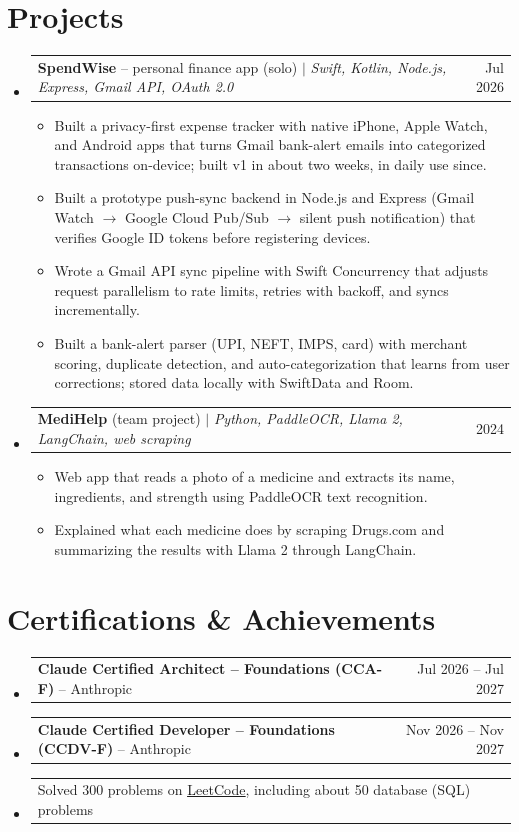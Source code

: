 \documentclass[a4paper,11pt]{article}
\makeatletter
\newcommand{\resumeItem}[1]{\item\small{#1\vspace{-1pt}}}
\newcommand{\resumeProjectHeading}[2]{
    \item
    \begin{tabularx}{0.97\textwidth}{@{}>{\raggedright\arraybackslash}X@{\hspace{0.75em}}r@{}}
      \small#1 & #2 \\
    \end{tabularx}\vspace{-3pt}
}
\newcommand{\resumeSubItemListStart}{\begin{itemize}[leftmargin=0.15in, label={}]}
\newcommand{\resumeSubItemListEnd}{\end{itemize}}
\newcommand{\resumeItemListStart}{\begin{itemize}[itemsep=2pt]}
\newcommand{\resumeItemListEnd}{\end{itemize}\vspace{-2pt}}
\makeatother
\begin{document}
\section{Projects}
  \resumeSubItemListStart

    \resumeProjectHeading
      {\textbf{SpendWise} -- personal finance app (solo) $|$ \emph{Swift, Kotlin, Node.js, Express, Gmail API, OAuth 2.0}}{Jul 2026}
      \resumeItemListStart
        \resumeItem{Built a privacy-first expense tracker with native iPhone, Apple Watch, and Android apps that turns Gmail bank-alert emails into categorized transactions on-device; built v1 in about two weeks, in daily use since.}
        \resumeItem{Built a prototype push-sync backend in Node.js and Express (Gmail Watch $\rightarrow$ Google Cloud Pub/Sub $\rightarrow$ silent push notification) that verifies Google ID tokens before registering devices.}
        \resumeItem{Wrote a Gmail API sync pipeline with Swift Concurrency that adjusts request parallelism to rate limits, retries with backoff, and syncs incrementally.}
        \resumeItem{Built a bank-alert parser (UPI, NEFT, IMPS, card) with merchant scoring, duplicate detection, and auto-categorization that learns from user corrections; stored data locally with SwiftData and Room.}
      \resumeItemListEnd

    \resumeProjectHeading
      {\textbf{MediHelp} (team project) $|$ \emph{Python, PaddleOCR, Llama 2, LangChain, web scraping}}{2024}
      \resumeItemListStart
        \resumeItem{Web app that reads a photo of a medicine and extracts its name, ingredients, and strength using PaddleOCR text recognition.}
        \resumeItem{Explained what each medicine does by scraping Drugs.com and summarizing the results with Llama 2 through LangChain.}
      \resumeItemListEnd

  \resumeSubItemListEnd

\section{Certifications \& Achievements}
  \resumeSubItemListStart
    \resumeProjectHeading
      {\textbf{Claude Certified Architect -- Foundations (CCA-F)} -- Anthropic}{Jul 2026 -- Jul 2027}
    \resumeProjectHeading
      {\textbf{Claude Certified Developer -- Foundations (CCDV-F)} -- Anthropic}{Nov 2026 -- Nov 2027}
    \resumeProjectHeading
      {Solved 300 problems on \href{https://leetcode.com/u/sAMurai7781/}{\underline{LeetCode}}, including about 50 database (SQL) problems}{}
  \resumeSubItemListEnd
\end{document}
